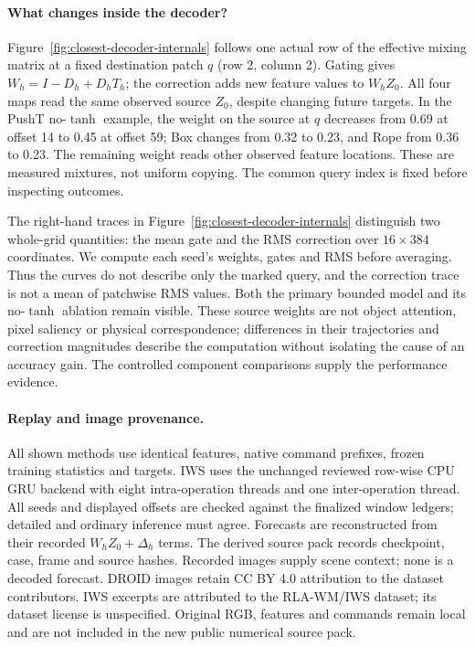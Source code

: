 \paragraph{What changes inside the decoder?}
Figure~\ref{fig:closest-decoder-internals} follows one actual row of the
effective mixing matrix at a fixed destination patch $q$ (row 2, column 2).
Gating gives $W_h=I-D_h+D_hT_h$; the correction adds new feature values to
$W_hZ_0$. All four maps read the same observed source $Z_0$, despite changing
future targets. In the PushT no-$\tanh$ example, the weight on the source at
$q$ decreases from 0.69 at offset 14 to 0.45 at offset 59; Box changes from
0.32 to 0.23, and Rope from 0.36 to 0.23. The remaining weight reads other
observed feature locations. These are measured mixtures, not uniform copying.
The common query index is fixed before inspecting outcomes.

The right-hand traces in Figure~\ref{fig:closest-decoder-internals} distinguish
two whole-grid quantities: the mean gate and the RMS correction over
$16\!\times\!384$ coordinates. We compute each
seed's weights, gates and RMS before averaging. Thus the curves do not describe
only the marked query, and the correction trace is not a mean of patchwise
RMS values. Both the primary bounded model and its no-$\tanh$ ablation remain
visible. These source weights are not object attention, pixel saliency or
physical correspondence; differences in their trajectories and correction
magnitudes describe the computation without isolating the cause of an accuracy
gain. The controlled component comparisons supply the performance evidence.



\paragraph{Replay and image provenance.}
All shown methods use identical features, native command prefixes, frozen
training statistics and targets. IWS uses the unchanged reviewed row-wise CPU
GRU backend with eight intra-operation threads and one inter-operation thread.
All seeds and displayed offsets are checked against the finalized window
ledgers; detailed and ordinary inference must agree. Forecasts are reconstructed
from their recorded $W_hZ_0+\Delta_h$ terms. The derived source pack records
checkpoint, case, frame and source hashes. Recorded images supply scene context;
none is a decoded forecast. DROID images retain CC BY 4.0 attribution to the
dataset contributors. IWS excerpts are attributed to the RLA-WM/IWS dataset;
its dataset license is unspecified. Original RGB, features and commands remain
local and are not included in the new public numerical source pack.
